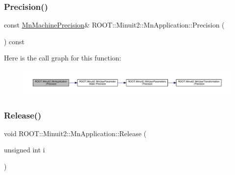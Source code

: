 \subsubsection{\texorpdfstring{Precision()}{Precision()}\hspace{0.1cm}{\footnotesize\ttfamily [3/3]}}
{\footnotesize\ttfamily const \mbox{\hyperlink{classROOT_1_1Minuit2_1_1MnMachinePrecision}{Mn\+Machine\+Precision}}\& R\+O\+O\+T\+::\+Minuit2\+::\+Mn\+Application\+::\+Precision (\begin{DoxyParamCaption}{ }\end{DoxyParamCaption}) const\hspace{0.3cm}{\ttfamily [inline]}}

Here is the call graph for this function\+:
\nopagebreak
\begin{figure}[H]
\begin{center}
\leavevmode
\includegraphics[width=350pt]{df/dd5/classROOT_1_1Minuit2_1_1MnApplication_a8de6eb3be52721cec183ba830504e7bc_cgraph}
\end{center}
\end{figure}
\mbox{\label{classROOT_1_1Minuit2_1_1MnApplication_ab690313ed666d5a794a13b05054f5575}} 
\subsubsection{\texorpdfstring{Release()}{Release()}\hspace{0.1cm}{\footnotesize\ttfamily [1/6]}}
{\footnotesize\ttfamily void R\+O\+O\+T\+::\+Minuit2\+::\+Mn\+Application\+::\+Release (\begin{DoxyParamCaption}\item[{unsigned int}]{i }\end{DoxyParamCaption})}

